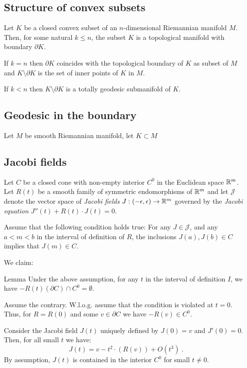 \documentclass[a4paper,10pt]{article}
\begin{document}
\subsection{Structure of convex subsets}
Let $K$ be a closed convex subset of an $n$-dimensional  Riemannian manifold $M$. Then, for some natural $k\leq n$, the subset $K$ is a topological manifold with boundary $\partial K$.

If $k=n$ then $\partial K$ coincides with the topological boundary of $K$ as subset of $M$ and 
$K\setminus \partial K$ is the set of inner points of $K$ in $M$.

If $k<n$ then $K\setminus \partial K$ is a totally geodesic submanifold of $K$.





\subsection{Geodesic in the boundary}
Let $M$ be  smooth Riemannian manifold, let $K\subset M$


\subsection{Jacobi fields}
Let $C$ be a closed cone with non-empty interior $C^0$ in the Euclidean space $\mathbb{R}^m$. Let $R(t)$ be a smooth family of symmetric endomorphisms of $\mathbb{R}^m$ and let $\mathcal J$ denote the vector space of \emph{Jacobi fields} 
$J:(-\epsilon, \epsilon) \to \mathbb{R}^m$  governed by the \emph{Jacobi equation} $J''(t)+R(t) \cdot J(t) =0$.

Assume that the following condition holds true:  For any $J\in \mathcal J$, and any $a<m<b$ in the interval of definition of $R$, the inclusions $J(a),J(b) \in C$ implies that $J(m)\in C$.

We claim:
\begin{thm}{Lemma}
	Under the above assumption, for any $t$ in the interval of definition $I$, we have 
	$-R(t) (\partial C)  \cap C^0 =\emptyset$. 
\end{thm}

	Assume the contrary. W.l.o.g. assume that the condition is violated at $t=0$.
	Thus, for $R=R(0)$ and some $v\in \partial C$ we have $-R(v)\in C^0$.
	
	Consider the Jacobi field $J(t)$ uniquely defined by 
	$J(0)=v$ and $J'(0)=0$.  
	Then, for all small $t$ we have:
	$$J(t)= v  -  t ^2 \cdot  (R (v)) + O(t^3)\;.$$
	By assumption,  $J(t)$ is contained in the interior $C^0$ for small $t \neq 0$.
	
\end{document}
